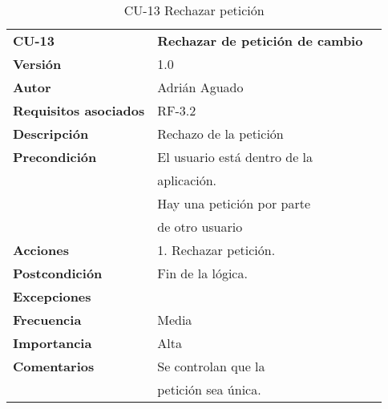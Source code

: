 \begin{table}[H]
\begin{tabular}{llr}  
\toprule
\begin{minipage}[b]{0.24\columnwidth}\raggedright\strut
\textbf{CU-13}\strut
\end{minipage} & \begin{minipage}[b]{0.72\columnwidth}\raggedright\strut
\textbf{Rechazar de petición de cambio}\strut
\end{minipage}\tabularnewline
\cmidrule(r){1-2}
\textbf{Versión}       & 1.0           \\
\textbf{Autor}       & Adrián  Aguado    \\
\textbf{Requisitos asociados}       & RF-3.2 \\
\textbf{Descripción} & Rechazo de la petición\\
\textbf{Precondición}  & El usuario está dentro de la \\
& aplicación.      \\
& Hay una petición por parte \\
& de otro usuario \\
\textbf{Acciones} & 1. Rechazar petición. \\
\textbf{Postcondición} & Fin de la lógica. \\
\textbf{Excepciones} &     \\
\textbf{Frecuencia} & Media          \\
\textbf{Importancia} & Alta            \\
\textbf{Comentarios } & Se controlan que la       \\
& petición sea única. \\
\bottomrule
\end{tabular}
\caption{CU-13 Rechazar petición} 
\end{table}

